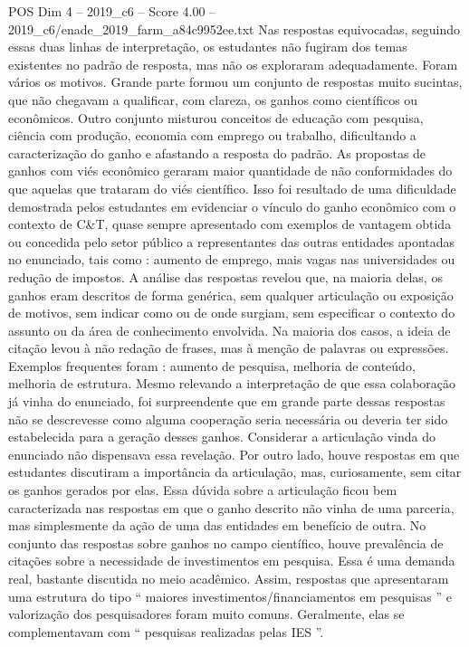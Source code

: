 \begin{textsample}{POS Dim 4 – 2019\_c6 – Score 4.00 – 2019\_c6/enade\_2019\_farm\_a84c9952ee.txt}
Nas respostas equivocadas, seguindo essas duas linhas de interpretação, os estudantes não fugiram dos temas existentes no padrão de resposta, mas não os exploraram adequadamente.
Foram vários os motivos.
Grande parte formou um conjunto de respostas muito sucintas, que não chegavam a qualificar, com clareza, os ganhos como científicos ou econômicos.
Outro conjunto misturou conceitos de educação com pesquisa, ciência com produção, economia com emprego ou trabalho, dificultando a caracterização do ganho e afastando a resposta do padrão.
As propostas de ganhos com viés econômico geraram maior quantidade de não conformidades do que aquelas que trataram do viés científico.
Isso foi resultado de uma dificuldade demostrada pelos estudantes em evidenciar o vínculo do ganho econômico com o contexto de C\&T, quase sempre apresentado com exemplos de vantagem obtida ou concedida pelo setor público a representantes das outras entidades apontadas no enunciado, tais como : aumento de emprego, mais vagas nas universidades ou redução de impostos.
A análise das respostas revelou que, na maioria delas, os ganhos eram descritos de forma genérica, sem qualquer articulação ou exposição de motivos, sem indicar como ou de onde surgiam, sem especificar o contexto do assunto ou da área de conhecimento envolvida.
Na maioria dos casos, a ideia de citação levou à não redação de frases, mas à menção de palavras ou expressões.
Exemplos frequentes foram : aumento de pesquisa, melhoria de conteúdo, melhoria de estrutura.
Mesmo relevando a interpretação de que essa colaboração já vinha do enunciado, foi surpreendente que em grande parte dessas respostas não se descrevesse como alguma cooperação seria necessária ou deveria ter sido estabelecida para a geração desses ganhos.
Considerar a articulação vinda do enunciado não dispensava essa revelação.
Por outro lado, houve respostas em que estudantes discutiram a importância da articulação, mas, curiosamente, sem citar os ganhos gerados por elas.
Essa dúvida sobre a articulação ficou bem caracterizada nas respostas em que o ganho descrito não vinha de uma parceria, mas simplesmente da ação de uma das entidades em benefício de outra.
No conjunto das respostas sobre ganhos no campo científico, houve prevalência de citações sobre a necessidade de investimentos em pesquisa.
Essa é uma demanda real, bastante discutida no meio acadêmico.
Assim, respostas que apresentaram uma estrutura do tipo “ maiores investimentos/financiamentos em pesquisas ” e valorização dos pesquisadores foram muito comuns.
Geralmente, elas se complementavam com “ pesquisas realizadas pelas IES ”.

\end{textsample}

